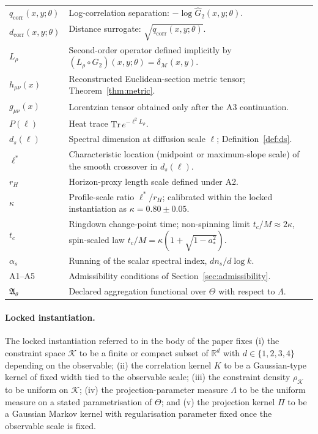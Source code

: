 ﻿\documentclass[12pt,a4paper]{article}
\theoremstyle{definition}
\begin{document}
\begin{longtable}{@{}p{3.0cm} p{11.5cm}@{}}
$q_{\mathrm{corr}}(x,y;\theta)$ & Log-correlation separation: $-\log \widehat{G}_2(x,y;\theta)$. \\
$d_{\mathrm{corr}}(x,y;\theta)$ & Distance surrogate: $\sqrt{q_{\mathrm{corr}}(x,y;\theta)}$. \\
$L_\rho$ & Second-order operator defined implicitly by $(L_\rho \circ G_2)(x,y;\theta) = \delta_\mathcal{M}(x,y)$. \\
$h_{\mu\nu}(x)$ & Reconstructed Euclidean-section metric tensor; Theorem~\ref{thm:metric}. \\
$g_{\mu\nu}(x)$ & Lorentzian tensor obtained only after the A3 continuation. \\
$P(\ell)$ & Heat trace $\mathrm{Tr}\,e^{-\ell^2 L_\rho}$. \\
$d_s(\ell)$ & Spectral dimension at diffusion scale $\ell$; Definition~\ref{def:ds}. \\
$\ell^\ast$ & Characteristic location (midpoint or maximum-slope scale) of the smooth crossover in $d_s(\ell)$. \\
$r_H$ & Horizon-proxy length scale defined under A2. \\
$\kappa$ & Profile-scale ratio $\ell^\ast/r_H$; calibrated within the locked instantiation as $\kappa = 0.80 \pm 0.05$. \\
$t_c$ & Ringdown change-point time; non-spinning limit $t_c/M \approx 2\kappa$, spin-scaled law $t_c/M=\kappa(1+\sqrt{1-a_\ast^2})$. \\
$\alpha_s$ & Running of the scalar spectral index, $d n_s / d\log k$. \\
A1--A5 & Admissibility conditions of Section~\ref{sec:admissibility}. \\
$\mathfrak{A}_\theta$ & Declared aggregation functional over $\Theta$ with respect to $\Lambda$. \\
\bottomrule
\end{longtable}

\paragraph{Locked instantiation.} The locked instantiation referred to in the body of the paper fixes (i) the constraint space $\mathcal{K}$ to be a finite or compact subset of $\mathbb{R}^d$ with $d \in \{1,2,3,4\}$ depending on the observable; (ii) the correlation kernel $K$ to be a Gaussian-type kernel of fixed width tied to the observable scale; (iii) the constraint density $\rho_{\mathcal{K}}$ to be uniform on $\mathcal{K}$; (iv) the projection-parameter measure $\Lambda$ to be the uniform measure on a stated parametrisation of $\Theta$; and (v) the projection kernel $\Pi$ to be a Gaussian Markov kernel with regularisation parameter fixed once the observable scale is fixed.
\end{document}
